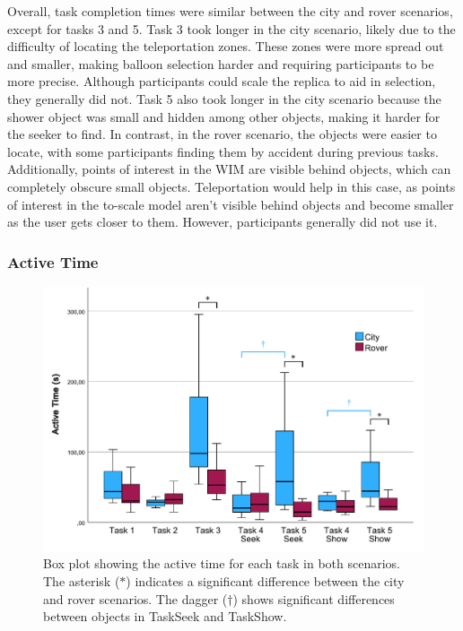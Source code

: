             Overall, task completion times were similar between the city and rover scenarios, except for tasks 3 and 5. Task 3 took longer in the city scenario, likely due to the difficulty of locating the teleportation zones. These zones were more spread out and smaller, making balloon selection harder and requiring participants to be more precise. Although participants could scale the replica to aid in selection, they generally did not. Task 5 also took longer in the city scenario because the shower object was small and hidden among other objects, making it harder for the seeker to find. In contrast, in the rover scenario, the objects were easier to locate, with some participants finding them by accident during previous tasks. Additionally, points of interest in the WIM are visible behind objects, which can completely obscure small objects. Teleportation would help in this case, as points of interest in the to-scale model aren't visible behind objects and become smaller as the user gets closer to them. However, participants generally did not use it.

        \subsubsection{Active Time}

   
            \begin{figure}[h!]
                \centering
                \includegraphics[width=1\linewidth]{figures/active_time_graph.pdf}
                \caption{Box plot showing the active time for each task in both scenarios. The asterisk ($\ast$) indicates a significant difference between the city and rover scenarios. The dagger ($\dag$)  shows significant differences between objects in TaskSeek and TaskShow.}
                \label{fig:active_time}
            \end{figure}

